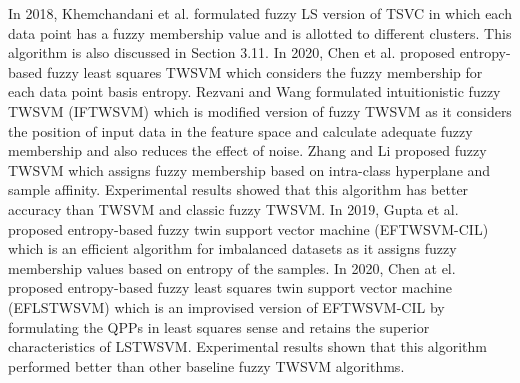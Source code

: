 \documentclass[pdflatex,sn-mathphys]{sn-jnl}%
\theoremstyle{thmstyleone}%
\theoremstyle{thmstyletwo}%
\theoremstyle{thmstylethree}%
\begin{document}
In 2018, Khemchandani et al. \cite{khemchandani2018fuzzy} formulated fuzzy LS version of TSVC in which each data point has a fuzzy membership value and is allotted to different clusters. This algorithm is also discussed in Section 3.11. In 2020, Chen et al. \cite{chen2020entropy} proposed entropy-based fuzzy least squares TWSVM which considers the fuzzy membership for each data point basis entropy. Rezvani and Wang \cite{rezvani2019intuitionistic} formulated intuitionistic fuzzy TWSVM (IFTWSVM) which is modified version of fuzzy TWSVM as it considers the position of input data in the feature space and calculate adequate fuzzy membership and also reduces the effect of noise. Zhang and Li \cite{zhang2019fuzzy} proposed fuzzy TWSVM which assigns fuzzy membership based on intra-class hyperplane and sample affinity. Experimental results showed that this algorithm has better accuracy than TWSVM and classic fuzzy TWSVM. In 2019, Gupta et al. \cite{gupta2019fuzzy} proposed entropy-based fuzzy twin support vector
machine (EFTWSVM-CIL) which is an efficient algorithm for imbalanced datasets as it assigns fuzzy membership values based on entropy of the samples. In 2020, Chen at el. \cite{chen2020entropy} proposed entropy-based fuzzy least squares twin support vector machine (EFLSTWSVM) which is an improvised version of EFTWSVM-CIL by formulating the QPPs in least squares sense and retains the superior characteristics of LSTWSVM. Experimental results shown that this algorithm performed better than other baseline fuzzy TWSVM algorithms.
\end{document}
